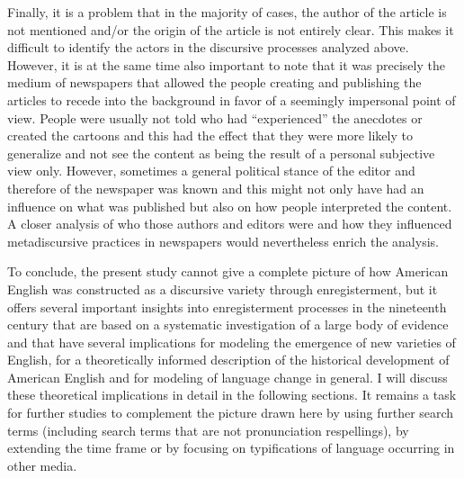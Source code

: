 Finally, it is a problem that in the majority of cases, the author of the article is not mentioned and/or the origin of the article is not entirely clear. This makes it difficult to identify the actors in the discursive processes analyzed above. However, it is at the same time also important to note that it was precisely the medium of newspapers that allowed the people creating and publishing the articles to recede into the background in favor of a seemingly impersonal point of view. People were usually not told who had “experienced” the anecdotes or created the cartoons and this had the effect that they were more likely to generalize and not see the content as being the result of a personal subjective view only. However, sometimes a general political stance of the editor and therefore of the newspaper was known and this might not only have had an influence on what was published but also on how people interpreted the content. A closer analysis of who those authors and editors were and how they influenced metadiscursive practices in newspapers would nevertheless enrich the analysis.

To conclude, the present study cannot give a complete picture of how American English was constructed as a discursive variety through enregisterment, but it offers several important insights into enregisterment processes in the nineteenth century that are based on a systematic investigation of a large body of evidence and that have several implications for modeling the emergence of new varieties of English, for a theoretically informed description of the historical development of American English and for modeling of language change in general. I will discuss these theoretical implications in detail in the following sections. It remains a task for further studies to complement the picture drawn here by using further search terms (including search terms that are not pronunciation respellings), by extending the time frame or by focusing on typifications of language occurring in other media.


